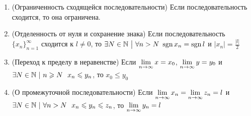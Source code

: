 \begin{theorem}
	\begin{enumerate}
		\item (Ограниченность сходящейся последовательности) Если последовательность сходится, то она ограничена.
		
		\item (Отделенность от нуля и сохранение знака) Если последовательность $\{x_n\}_{n = 1}^\infty$ сходится к $l \neq 0$, то $\exists N \in \N \such \forall n > N\ \sgn x_n = \sgn l$ и $|x_n| = \frac{|l|}{2}$
		
		\item (Переход к пределу в неравенстве) Если $\lim\limits_{n \to \infty} x = x_0$, $\lim\limits_{n \to \infty} y = y_0$ и $\exists N \in \mathbb{N}\ |\ n \geqslant N\ \ x_n \leqslant y_n$, то $x_0 \le y_0$
		
		\item (О промежуточной последовательности) Если $\lim\limits_{n \to \infty} x_n = \lim\limits_{n \to \infty} z_n = l$ и $\exists N \in \mathbb{N}\ |\ \forall n > N\ \ x_n \leqslant y_n \leqslant z_n$, то $\lim\limits_{n \to \infty} y_n = l$
	\end{enumerate}
\end{theorem}


